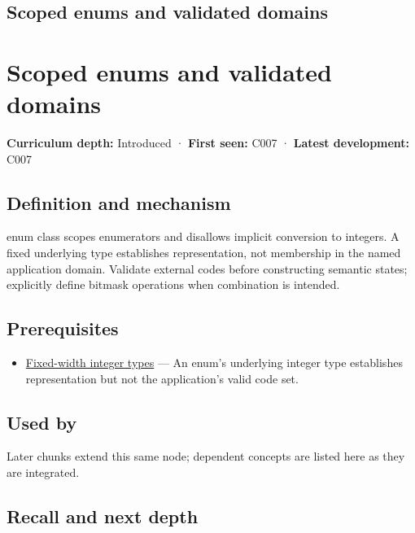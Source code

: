 \hypertarget{appendix-23640fcee147}{}
\section*{Scoped enums and validated domains}
\chapter{Scoped enums and validated domains}\label{appendix-23640fcee147-scoped-enums-and-validated-domains}

\textbf{Curriculum depth:} Introduced · \textbf{First seen:} C007 · \textbf{Latest development:} C007

\section{Definition and mechanism}\label{appendix-23640fcee147-definition-and-mechanism}

enum class scopes enumerators and disallows implicit conversion to integers. A fixed underlying type establishes representation, not membership in the named application domain. Validate external codes before constructing semantic states; explicitly define bitmask operations when combination is intended.

\section{Prerequisites}\label{appendix-23640fcee147-prerequisites}

\begin{itemize}
\tightlist
\item
  \hyperref[appendix-cc04044b5782]{Fixed-width integer types} --- An enum's underlying integer type establishes representation but not the application's valid code set.
\end{itemize}

\section{Used by}\label{appendix-23640fcee147-used-by}

Later chunks extend this same node; dependent concepts are listed here as they are integrated.

\section{Recall and next depth}\label{appendix-23640fcee147-recall-and-next-depth}

